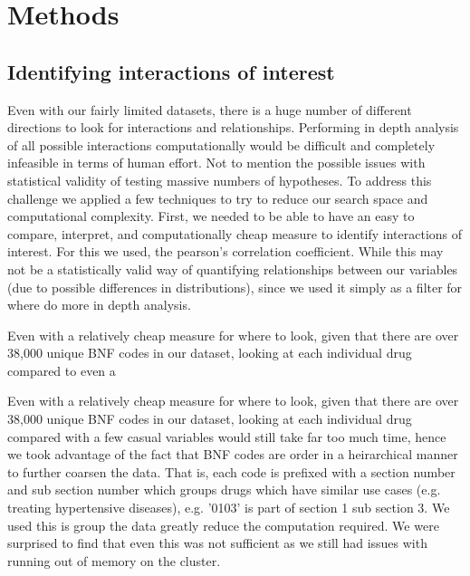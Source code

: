 \documentclass[a4paper]{article}
\begin{document}


\section{Methods}
	
	\subsection{Identifying interactions of interest}


		Even with our fairly limited datasets, there is a huge number of different directions to 
		look for interactions and relationships. Performing in depth analysis of all possible interactions computationally 
		would be difficult and completely infeasible in terms of human effort. Not to mention the possible 
		issues with statistical validity of testing massive numbers of hypotheses. To address this challenge
		we applied a few techniques to try to reduce our search space and computational complexity. First,
		we needed to be able to have an easy to compare, interpret, and computationally cheap measure
		to identify interactions of interest. For this we used, the pearson's correlation coefficient. While
		this may not be a statistically valid way of quantifying relationships between our variables (due to 
		possible differences in distributions), since we used it simply as a filter for where do more in depth
		analysis. 

		Even with a relatively cheap measure for where to look, given that there are over 38,000 unique BNF codes in 
		our dataset, looking at each individual drug compared to even a

		Even with a relatively cheap measure for where to look, given that there are over 38,000 unique BNF codes in 
		our dataset, looking at each individual drug compared with a few casual variables would still take 
		far too much time, hence we took advantage of the fact that BNF codes are order in a heirarchical manner to 
		further coarsen the data. That is, each code is prefixed with a section number and sub section number which groups 
		drugs which have similar use cases (e.g. treating hypertensive diseases), e.g.
		'0103' is part of section 1 sub section 3. We used this is group the data greatly reduce the computation 
		required. We were surprised to find that even this was not sufficient as we still had issues with running out
		of memory on the cluster. 
\end{document}
